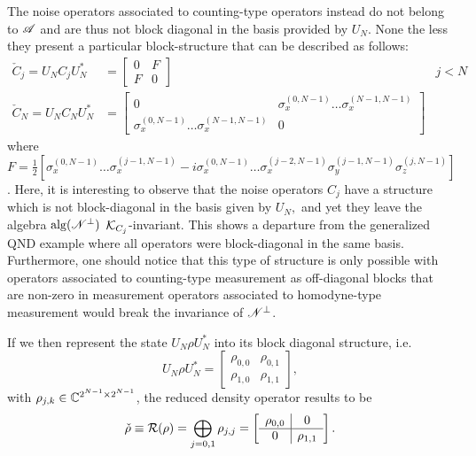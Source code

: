 \documentclass[aihp,12pt]{imsart}
\begin{document}
The noise operators associated to counting-type operators instead do not belong to $\mathscr{A}$ and are thus not block diagonal in the basis provided by $U_N$. None the less they present a particular block-structure that can be described as follows:
\begin{align*}
    \check{C}_j = U_N C_j U_N^* &= \left[\begin{array}{c|c}
         0&F  \\\hline
         F&0
    \end{array}\right] & j<N \\
    \check{C}_N = U_N C_N U_N^* &= \left[\begin{array}{c|c}
         0&\sigma_x^{(0,N-1)}\dots\sigma_x^{(N-1,N-1)}  \\\hline
         \sigma_x^{(0,N-1)}\dots\sigma_x^{(N-1,N-1)}&0
    \end{array}\right] &
\end{align*}
where $F = \frac{1}{2}\left[\sigma_x^{(0,N-1)}\dots\sigma_x^{(j-1,N-1)} -i \sigma_x^{(0,N-1)}\dots\sigma_x^{(j-2,N-1)}\sigma_y^{(j-1,N-1)} \sigma_z^{(j,N-1)}\right]$.
Here, it is interesting to observe that the noise operators $C_j$ have a structure which is not block-diagonal in the basis given by $U_N,$ and yet they leave the algebra ${\rm alg}(\mathscr{N}^\perp)$ $\mathcal{K}_{C_j}$-invariant. This shows a departure from the generalized QND example where all operators were block-diagonal in the same basis. Furthermore, one should notice that this type of structure is only possible with operators associated to counting-type measurement as off-diagonal blocks that are non-zero in measurement operators associated to homodyne-type measurement would break the invariance of $\mathscr{N}^\perp$.

If we then represent the state $U_N\rho U_N^*$ into its block diagonal structure, i.e. 
\begin{equation*}
    U_N\rho U_N^* = \left[\begin{array}{c|c}
    \rho_{0,0} & \rho_{0,1}\\\hline
    \rho_{1,0} & \rho_{1,1}
    \end{array}\right], 
\end{equation*}
with $\rho_{j,k}\in\mathbb{C}^{2^{N-1}\times 2^{N-1}}$, the reduced density operator results to be 
\[\check{\rho} \equiv \mathcal{R}(\rho) = \bigoplus_{j=0,1} {\rho}_{j,j}
= \left[\begin{array}{c|c}
    \rho_{0,0} & 0\\\hline
    0 & \rho_{1,1}
    \end{array}\right].
\]
\end{document}
